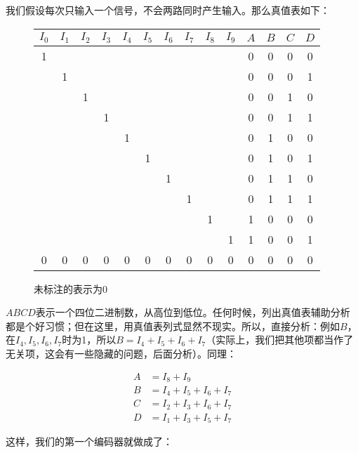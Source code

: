 \documentclass[UTF8]{ctexart}
\begin{document}
我们假设每次只输入一个信号，不会两路同时产生输入。那么真值表如下：

\begin{figure}
    \begin{tabular}{|c|c|c|c|c|c|c|c|c|c|c|c|c|c|}\hline\rowcolor{lightgray}
        $I_0$ & $I_1$ & $I_2$ & $I_3$ & $I_4$ & $I_5$ & $I_6$ & $I_7$ & $I_8$ & $I_9$ & $A$ & $B$ & $C$ & $D$\\\hline
        1& & & & & & & & & &0&0&0&0\\\hline
         &1& & & & & & & & &0&0&0&1\\\hline
         & &1& & & & & & & &0&0&1&0\\\hline
         & & &1& & & & & & &0&0&1&1\\\hline
         & & & &1& & & & & &0&1&0&0\\\hline
         & & & & &1& & & & &0&1&0&1\\\hline
         & & & & & &1& & & &0&1&1&0\\\hline
         & & & & & & &1& & &0&1&1&1\\\hline
         & & & & & & & &1& &1&0&0&0\\\hline
         & & & & & & & & &1&1&0&0&1\\\hline
        0&0&0&0&0&0&0&0&0&0&0&0&0&0\\\hline
    \end{tabular}
    \caption*{未标注的表示为0}
\end{figure}

$ABCD$表示一个四位二进制数，从高位到低位。任何时候，列出真值表辅助分析都是个好习惯；但在这里，用真值表列式显然不现实。所以，直接分析：例如$B$，在$I_4,I_5,I_6,I_7$时为1，所以$B=I_4+I_5+I_6+I_7$（实际上，我们把其他项都当作了无关项，这会有一些隐藏的问题，后面分析）。同理：

\begin{equation*}
\begin{aligned}
A&=I_8+I_9\\
B&=I_4+I_5+I_6+I_7\\
C&=I_2+I_3+I_6+I_7\\
D&=I_1+I_3+I_5+I_7
\end{aligned}
\end{equation*}

这样，我们的第一个编码器就做成了：
\end{document}
